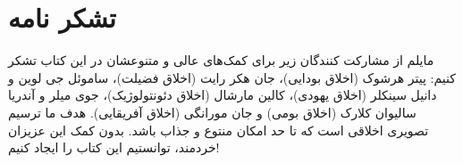 
{
\section*{تشکر نامه}
\label{sec:تشکر نامه}
مایلم از مشارکت کنندگان زیر برای کمک‌های عالی و متنوعشان در این کتاب تشکر کنیم: پیتر هرشوک (اخلاق بودایی)، جان هکر رایت (اخلاق فضیلت)، ساموئل جی لوین و دانیل سینکلر (اخلاق یهودی)، کالین مارشال (اخلاق دئونتولوژیک)، جوی میلر و آندریا سالیوان کلارک (اخلاق بومی) و جان مورانگی (اخلاق آفریقایی).
هدف ما ترسیم تصویری اخلاقی است که تا حد امکان منتوع و جذاب باشد.
بدون کمک این عزیزان خردمند، توانستیم این کتاب را ایجاد کنیم!
}


\newpage

